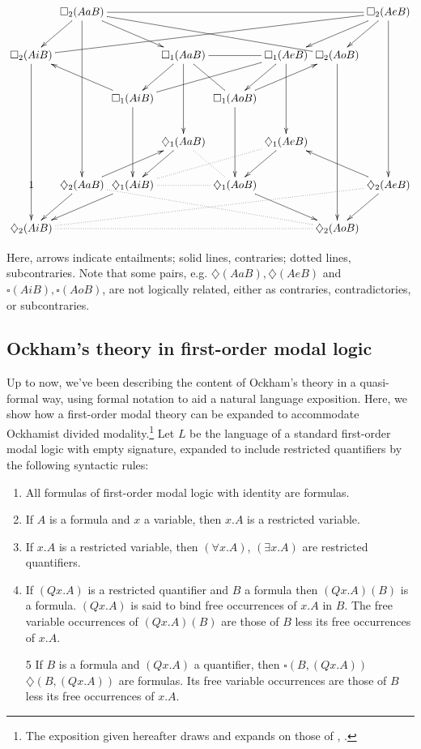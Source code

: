\documentclass[a4paper]{article}
\begin{document}
\begin{displaymath}
\xymatrix@C=.1em{
	 & \square_{2}(AaB) \ar[dddd] \ar[drr] \ar [dl] \ar@{-}[rrrrrr] \ar@{-}[drrrrr] &  &  &  &  &  & \square_{2}(AeB) \ar[dddd] \ar[dl] \ar[dll]\\
	\square_{2}(AiB) \ar[dddd] \ar@{-}[urrrrrrr] &  &  & \square_{1}(AaB) \ar[dd] \ar[dl] \ar@{-}[rr] \ar@{-}[dr]
	 &  & \square_{1}(AeB) \ar[dd] \ar[dl] \ar@{-}[dlll] & \square_{2}(AoB) \ar[dddd] &  \\
	 &  & \square_{1}(AiB) \ar[dd] \ar[ull] &  & \square_{1}(AoB) \ar[dd] \ar[urr] &  &  &  \\
	 &  &  & \diamondsuit_{1}(AaB) \ar[dl] \ar@{.}[dr] &  & \diamondsuit_{1}(AeB) \ar[dl] &  &  \\ 
	 1 & \diamondsuit_{2}(AaB) \ar[dl] \ar[urr] \ar@{.}[drrrrr] & \diamondsuit_{1}(AiB) \ar[dll] \ar@{.}[rr] \ar@{.}[rrru]& & \diamondsuit_{1}(AoB) \ar[drr] &  &  & \diamondsuit_{2}(AeB) \ar[ull] \ar[dl] \\
	\diamondsuit_{2}(AiB) \ar@{.}[rrrrrr] \ar@{.}[rrrrrrru] &  &  &  &  &  & \diamondsuit_{2}(AoB) & }
\end{displaymath}

Here, arrows indicate entailments; solid lines, contraries; dotted lines, subcontraries. Note that some pairs, e.g. $\diamondsuit(AaB), \diamondsuit(AeB)$ and $\square(AiB), \square(AoB)$, are not logically related, either as contraries, contradictories, or subcontraries.

\subsection{Ockham's theory in first-order modal logic}
Up to now, we've been describing the content of Ockham's theory in a quasi-formal way, using formal notation to aid a natural language exposition. Here, we show how a first-order modal theory can be expanded to accommodate Ockhamist divided modality.\footnote{The exposition given hereafter draws and expands on those of \cite{Klima1988}, \cite{Klima2001}.} Let $L$ be the language of a standard first-order modal logic with empty signature, expanded to include restricted quantifiers by the following syntactic rules: 
\begin{enumerate}
	\item All formulas of first-order modal logic with identity are formulas.
	\item If $A$ is a formula and $x$ a variable, then $x.A$ is a restricted variable. 
	\item If $x.A$ is a restricted variable, then $(\forall x.A)$, $(\exists x.A)$ are restricted quantifiers. 
	\item If $(Qx.A)$ is a restricted quantifier and $B$ a formula then $(Qx.A)(B)$ is a formula. $(Qx.A)$ is said to bind free occurrences of $x.A$ in $B$. The free variable occurrences of $(Qx.A)(B)$ are those of $B$ less its free occurrences of $x.A$.
	\item[5] If $B$ is a formula and $(Qx.A)$ a quantifier, then $\square(B, (Qx.A))$ $\diamondsuit(B, (Qx.A))$ are formulas. Its free variable occurrences are those of $B$ less its free occurrences of $x.A$.
	\end{enumerate}
	
\end{document}
